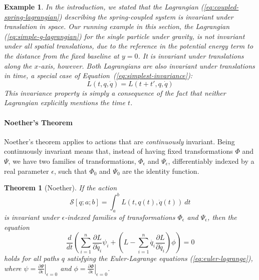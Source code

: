 \documentclass{sigplanconf}
\newtheorem{theorem}{Theorem}
\theoremstyle{examplestyle}
\newtheorem{example}{Example}
\begin{document}
\begin{example}\label{ex:invariance-examples}
  In the introduction, we stated that the Lagrangian
  (\ref{eq:coupled-spring-lagrangian}) describing the spring-coupled
  system is invariant under translation in space. Our running example
  in this section, the Lagrangian (\ref{eq:simple-g-lagrangian}) for
  the single particle under gravity, is not invariant under all
  spatial translations, due to the reference in the potential energy
  term to the distance from the fixed baseline at $y = 0$. It is
  invariant under translations along the $x$-axis, however. Both
  Lagrangians are also invariant under translations in time, a special
  case of Equation~(\ref{eq:simplest-invariance}):
  \begin{displaymath}
    L(t,q,\dot{q}) = L(t+t',q,\dot{q})
  \end{displaymath}
  This invariance property is simply a consequence of the fact that
  neither Lagrangian explicitly mentions the time $t$.
\end{example}

\paragraph{Noether's Theorem} Noether's theorem applies to actions
that are \emph{continuously} invariant. Being continuously invariant
means that, instead of having fixed transformations $\Phi$ and $\Psi$,
we have two families of transformations, $\Phi_\epsilon$ and
$\Psi_\epsilon$, differentiably indexed by a real parameter
$\epsilon$, such that $\Phi_0$ and $\Psi_0$ are the identity function.

\begin{theorem}[Noether]\label{thm:noether}
  If the action
  \begin{displaymath}
    \mathcal{S}[q;a;b] = \int_a^b L(t,q(t),\dot{q}(t))~dt
  \end{displaymath}
  is invariant under $\epsilon$-indexed families of transformations
  $\Phi_\epsilon$ and $\Psi_\epsilon$, then the equation
  \begin{equation}
    \label{eq:conservation-law}
    \frac{d}{dt}\left(\sum_{i=1}^n \frac{\partial L}{\partial \dot{q_i}}\psi_i + \left(L - \sum_{i=1}^n \dot{q_i}\frac{\partial L}{\partial \dot{q_i}}\right) \phi \right) = 0
  \end{equation}
  holds for all paths $q$ satisfying the Euler-Lagrange equations
  (\ref{eq:euler-lagrange}), where $\psi = \left. \frac{\partial
      \Psi}{\partial \epsilon} \right|_{\epsilon = 0}$ and $\phi =
  \left. \frac{\partial \Phi}{\partial \epsilon} \right|_{\epsilon =
    0}$.
\end{theorem}
\end{document}
